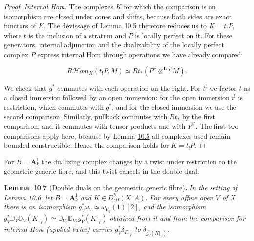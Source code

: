 \documentclass[11pt]{article}
\newenvironment{bpstatement}[2]{\par\addvspace{0.6\baselineskip}\noindent\textbf{#1}#2\textbf{.}\enspace\ignorespaces}
  {\par\addvspace{0.4\baselineskip}}
\newenvironment{bpstatementit}[2]{\begin{bpstatement}{#1}{#2}\itshape\ignorespaces}{\end{bpstatement}}
\providecommand{\cHom}{}\renewcommand{\cHom}{R\mathcal{H}\!om}
\begin{document}
\begin{proof}[{Proof}]
\emph{Internal Hom.} The complexes \(K\) for which the comparison is an isomorphism are closed under cones and shifts, because both sides are exact functors of \(K\). The dévissage of Lemma \hyperref[bp16]{10.5} therefore reduces us to \(K=t_!P\), where \(t\) is the inclusion of a stratum and \(P\) is locally perfect on it. For these generators, internal adjunction and the dualizability of the locally perfect complex \(P\) express internal Hom through operations we have already compared:

\[
\cHom_X(t_!P,M)
\simeq Rt_*(P^\vee\otimes^{\mathbf L}t^!M).
\]

We check that \(g^*\) commutes with each operation on the right. For \(t^!\) we factor \(t\) as a closed immersion followed by an open immersion: for the open immersion \(t^!\) is restriction, which commutes with \(g^*\), and for the closed immersion we use the second comparison. Similarly, pullback commutes with \(Rt_*\) by the first comparison, and it commutes with tensor products and with \(P^\vee\). The first two comparisons apply here, because by Lemma \hyperref[bp16]{10.5} all complexes used remain bounded constructible. Hence the comparison holds for \(K=t_!P\).
\end{proof}

\label{bp21}%
For \(B=\mathbf A^1_k\) the dualizing complex changes by a twist under restriction to the geometric generic fibre, and this twist cancels in the double dual.

\label{bp22}%
\begin{bpstatementit}{Lemma~10.7}{ (Double duals on the geometric generic fibre)}
In the setting of Lemma \hyperref[bp19]{10.6}, let \(B=\mathbf A^1_k\) and \(K\in D^b_{\mathrm{ctf}}(X,A)\). For every affine open \(V\) of \(X\) there is an isomorphism \(g_V^*\omega_V\simeq\omega_{V_{\bar\eta}}(1)[2]\), and the isomorphism \(g_V^*\mathbb D_V\mathbb D_V(K|_V)\simeq\mathbb D_{V_{\bar\eta}}
\mathbb D_{V_{\bar\eta}}g_V^*(K|_V)\) obtained from it and from the comparison for internal Hom (applied twice) carries \(g_V^*\delta_{K|_V}\) to \(\delta_{g_V^*(K|_V)}\).
\end{bpstatementit}
\end{document}
